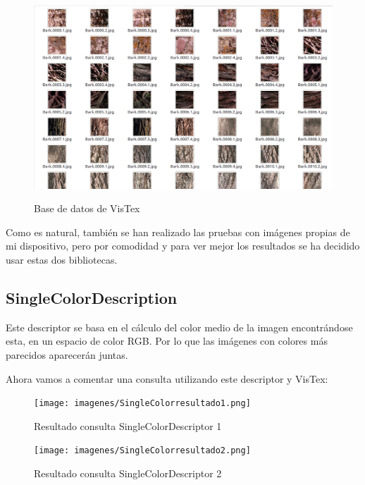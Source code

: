 \begin{figure}[H] %
\centering
\includegraphics[scale=0.4]{imagenes/texturas.png}  %
\label{texturas}
\caption{Base de datos de VisTex}
\end{figure}

Como es natural, también se han realizado las pruebas con imágenes propias de mi dispositivo, pero por comodidad y para ver mejor los resultados se ha decidido usar estas dos bibliotecas.


\subsection{SingleColorDescription}

Este descriptor se basa en el cálculo del color medio de la imagen encontrándose esta, en un espacio de color RGB. Por lo que las imágenes con colores más parecidos aparecerán juntas.

Ahora vamos a comentar una consulta utilizando este descriptor y VisTex:

\begin{figure}[H] %
\centering
\texttt{[image: imagenes/SingleColorresultado1.png]}  %
\label{SingleColorresultado1.png}
\caption{Resultado consulta SingleColorDescriptor 1 }
\end{figure}

\begin{figure}[H] %
\centering
\texttt{[image: imagenes/SingleColorresultado2.png]}  %
\label{SingleColorresultado2.png}
\caption{Resultado consulta SingleColorDescriptor 2 }
\end{figure}

